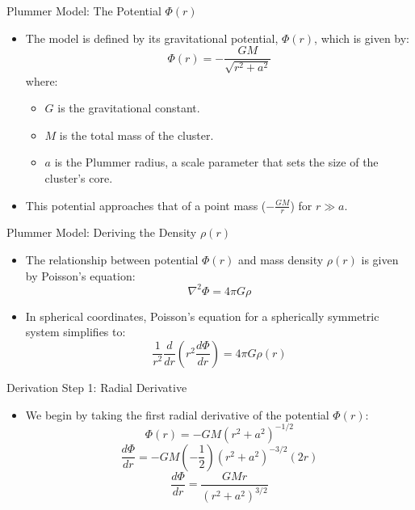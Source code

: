 \documentclass{beamer}
\begin{document}
\begin{frame}{Plummer Model: The Potential $\Phi(r)$}
    \begin{itemize}
        \item The model is defined by its gravitational potential, $\Phi(r)$, which is given by:
        $$ \Phi(r) = - \frac{GM}{\sqrt{r^2 + a^2}} $$
        where:
        \begin{itemize}
            \item $G$ is the gravitational constant.
            \item $M$ is the total mass of the cluster.
            \item $a$ is the Plummer radius, a scale parameter that sets the size of the cluster's core.
        \end{itemize}
        \item This potential approaches that of a point mass ($-\frac{GM}{r}$) for $r \gg a$.
    \end{itemize}
\end{frame}

\begin{frame}{Plummer Model: Deriving the Density $\rho(r)$}
    \begin{itemize}
        \item The relationship between potential $\Phi(r)$ and mass density $\rho(r)$ is given by Poisson's equation:
        $$ \nabla^2 \Phi = 4 \pi G \rho $$
        \item In spherical coordinates, Poisson's equation for a spherically symmetric system simplifies to:
        $$ \frac{1}{r^2} \frac{d}{dr} \left( r^2 \frac{d\Phi}{dr} \right) = 4 \pi G \rho(r) $$
    \end{itemize}
\end{frame}

\begin{frame}{Derivation Step 1: Radial Derivative}
    \begin{itemize}
        \item We begin by taking the first radial derivative of the potential $\Phi(r)$:
        $$ \Phi(r) = -GM(r^2 + a^2)^{-1/2} $$
        $$ \frac{d\Phi}{dr} = -GM \left( -\frac{1}{2} \right) (r^2 + a^2)^{-3/2} (2r) $$
        $$ \frac{d\Phi}{dr} = \frac{GMr}{(r^2 + a^2)^{3/2}} $$
    \end{itemize}
\end{frame}
\end{document}
